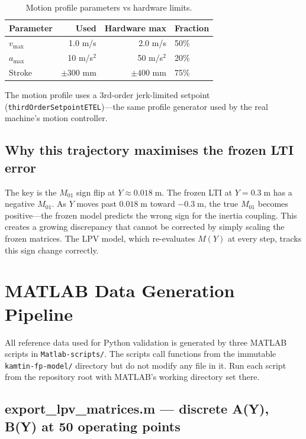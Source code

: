 \documentclass[11pt,a4paper]{article}
\begin{document}
\begin{table}[ht]
\centering
\caption{Motion profile parameters vs hardware limits.}
\label{tab:motion}
\begin{tabular}{lrrl}
\toprule
Parameter & Used & Hardware max & Fraction \\
\midrule
$v_{\max}$ & 1.0 m/s & 2.0 m/s & 50\% \\
$a_{\max}$ & 10 m/s$^2$ & 50 m/s$^2$ & 20\% \\
Stroke     & $\pm 300$ mm & $\pm 400$ mm & 75\% \\
\bottomrule
\end{tabular}
\end{table}

The motion profile uses a 3rd-order jerk-limited setpoint
(\texttt{thirdOrderSetpointETEL})---the same profile generator used by the real machine's
motion controller.

\subsection{Why this trajectory maximises the frozen LTI error}

The key is the $M_{01}$ sign flip at $Y \approx 0.018\;\text{m}$. The frozen LTI at
$Y = 0.3\;\text{m}$ has a negative $M_{01}$. As $Y$ moves past $0.018\;\text{m}$ toward
$-0.3\;\text{m}$, the true $M_{01}$ becomes positive---the frozen model predicts the wrong
sign for the inertia coupling. This creates a growing discrepancy that cannot be corrected by
simply scaling the frozen matrices. The LPV model, which re-evaluates $M(Y)$ at every step,
tracks this sign change correctly.


\section{MATLAB Data Generation Pipeline}
\label{sec:matlab}

All reference data used for Python validation is generated by three MATLAB scripts in
\texttt{Matlab-scripts/}. The scripts call functions from the immutable
\texttt{kamtin-fp-model/} directory but do not modify any file in it.
Run each script from the repository root with MATLAB's working directory set there.

\subsection{export\_lpv\_matrices.m --- discrete A(Y), B(Y) at 50 operating points}
\label{sec:export_matrices}
\end{document}
